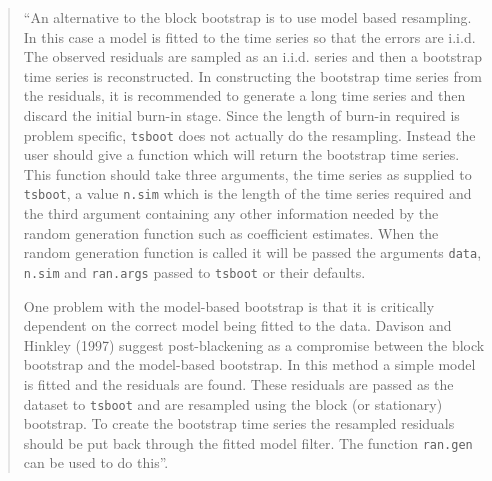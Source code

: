 \documentclass[]{book}
\theoremstyle{definition}
\theoremstyle{definition}
\theoremstyle{definition}
\theoremstyle{remark}
\begin{document}
\begin{quote}
``An alternative to the block bootstrap is to use model based
resampling. In this case a model is fitted to the time series so that
the errors are i.i.d. The observed residuals are sampled as an i.i.d.
series and then a bootstrap time series is reconstructed. In
constructing the bootstrap time series from the residuals, it is
recommended to generate a long time series and then discard the initial
burn-in stage. Since the length of burn-in required is problem specific,
\texttt{tsboot} does not actually do the resampling. Instead the user
should give a function which will return the bootstrap time series. This
function should take three arguments, the time series as supplied to
\texttt{tsboot}, a value \texttt{n.sim} which is the length of the time
series required and the third argument containing any other information
needed by the random generation function such as coefficient estimates.
When the random generation function is called it will be passed the
arguments \texttt{data}, \texttt{n.sim} and \texttt{ran.args} passed to
\texttt{tsboot} or their defaults.

One problem with the model-based bootstrap is that it is critically
dependent on the correct model being fitted to the data. Davison and
Hinkley (1997) suggest post-blackening as a compromise between the block
bootstrap and the model-based bootstrap. In this method a simple model
is fitted and the residuals are found. These residuals are passed as the
dataset to \texttt{tsboot} and are resampled using the block (or
stationary) bootstrap. To create the bootstrap time series the resampled
residuals should be put back through the fitted model filter. The
function \texttt{ran.gen} can be used to do this''.
\end{quote}
\end{document}
